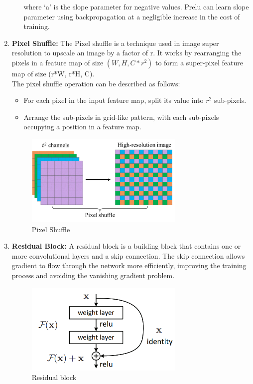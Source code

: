 \begin{enumerate}
\begin{itemize}
               where ‘a’ is the slope parameter for negative values. Prelu can learn slope parameter using backpropagation at a negligible increase in the cost of training.
        \end{itemize}
        \item {\bf Pixel Shuffle:} The Pixel shuffle is a technique used in image super resolution to upscale an image by a factor of r. It works by rearranging the pixels in a feature map of size $(W,H,C * r^2)$ to form a super-pixel feature map of size (r*W, r*H, C). \cite{r7}\\The pixel shuffle operation can be described as follows:
        \begin{itemize}
            \item For each pixel in the input feature map, split its value into $r^2$ sub-pixels.
            \item Arrange the sub-pixels in grid-like pattern, with each sub-pixels occupying a position in a feature map.
        \end{itemize}
        \begin{figure}[ht]
            \centering
            \includegraphics[width=3in]{./figures/pixelshuffle.png}
            \caption{Pixel Shuffle}
        \end{figure}
        \item {\bf Residual Block:} A residual block is a building block that contains one or more convolutional layers and a skip connection. The skip connection allows gradient to flow through the network more efficiently, improving the training process and avoiding the vanishing gradient problem.
        \begin{figure}[h!]
            \centering
            \includegraphics[width=3in]{./figures/residualblock.png}
            \caption{Residual block}
        \end{figure}
    \end{enumerate}
    \nocite{r8}
